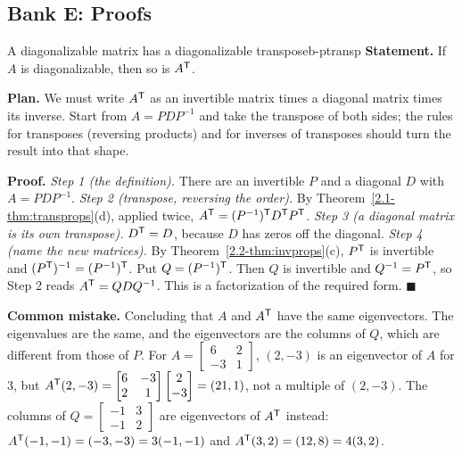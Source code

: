 \documentclass[11pt]{article}
\begin{document}
\subsection*{Bank E: Proofs}
\begin{exmp}{A diagonalizable matrix has a diagonalizable transpose}{b-ptransp}
\textbf{Statement.} If $A$ is diagonalizable, then so is $A^{\mathsf T}$.

\textbf{Plan.} We must write $A^{\mathsf T}$ as an invertible matrix times a diagonal matrix times its inverse. Start from $A=PDP^{-1}$ and take the transpose of both sides; the rules for transposes (reversing products) and for inverses of transposes should turn the result into that shape.

\textbf{Proof.}
\emph{Step 1 (the definition).} There are an invertible $P$ and a diagonal $D$ with $A=PDP^{-1}$.
\emph{Step 2 (transpose, reversing the order).} By Theorem~\ref{2.1-thm:transprops}(d), applied twice, $A^{\mathsf T}=(P^{-1})^{\mathsf T} D^{\mathsf T} P^{\mathsf T}$.
\emph{Step 3 (a diagonal matrix is its own transpose).} $D^{\mathsf T}=D$, because $D$ has zeros off the diagonal.
\emph{Step 4 (name the new matrices).} By Theorem~\ref{2.2-thm:invprops}(c), $P^{\mathsf T}$ is invertible and $(P^{\mathsf T})^{-1}=(P^{-1})^{\mathsf T}$. Put $Q=(P^{-1})^{\mathsf T}$. Then $Q$ is invertible and $Q^{-1}=P^{\mathsf T}$, so Step 2 reads $A^{\mathsf T}=QDQ^{-1}$. This is a factorization of the required form. \qquad$\blacksquare$

\textbf{Common mistake.} Concluding that $A$ and $A^{\mathsf T}$ have the same eigenvectors. The eigenvalues are the same, and the eigenvectors are the columns of $Q$, which are different from those of $P$. For $A=\begin{bmatrix}6&2\\-3&1\end{bmatrix}$, $(2,-3)$ is an eigenvector of $A$ for $3$, but $A^{\mathsf T}(2,-3)=\begin{bmatrix}6&-3\\2&1\end{bmatrix}\begin{bmatrix}2\\-3\end{bmatrix}=(21,1)$, not a multiple of $(2,-3)$. The columns of $Q=\begin{bmatrix}-1&3\\-1&2\end{bmatrix}$ are eigenvectors of $A^{\mathsf T}$ instead: $A^{\mathsf T}(-1,-1)=(-3,-3)=3(-1,-1)$ and $A^{\mathsf T}(3,2)=(12,8)=4(3,2)$.
\end{exmp}
\end{document}
